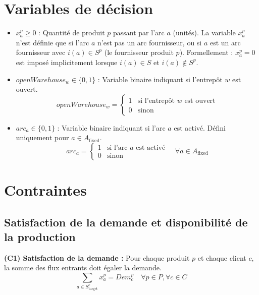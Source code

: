 \documentclass{article}
\begin{document}
\section{Variables de décision}

\begin{itemize}
    \item $x_a^p \ge 0$ : Quantité de produit $p$ passant par l'arc $a$ (unités).
    La variable $x_a^p$ n'est définie que si l'arc $a$ n'est pas un arc fournisseur,
    ou si $a$ est un arc fournisseur avec $i(a) \in S^p$ (le fournisseur produit $p$).
    Formellement : $x_a^p = 0$ est imposé implicitement lorsque $i(a) \in S$ et $i(a) \notin S^p$.

    \item $openWarehouse_w \in \{0, 1\}$ : Variable binaire indiquant si l'entrepôt $w$ est ouvert.
    \begin{equation*}
        openWarehouse_w = \begin{cases}
            1 & \text{si l'entrepôt } w \text{ est ouvert} \\
            0 & \text{sinon}
        \end{cases}
    \end{equation*}

    \item $arc_a \in \{0, 1\}$ : Variable binaire indiquant si l'arc $a$ est activé.
    \quad Défini uniquement pour $a \in A_{\text{fixed}}$.
    \begin{equation*}
        arc_a = \begin{cases}
            1 & \text{si l'arc } a \text{ est activé} \\
            0 & \text{sinon}
        \end{cases} \quad \forall a \in A_{\text{fixed}}
    \end{equation*}

\end{itemize}

\section{Contraintes}

\subsection{Satisfaction de la demande et disponibilité de la production}

\noindent\textbf{(C1) Satisfaction de la demande :}
Pour chaque produit $p$ et chaque client $c$, la somme des flux entrants doit égaler la demande.
\begin{equation}
    \sum_{a \in S_{\text{target}}^c} x_a^p = Dem_c^p \quad \forall p \in P, \forall c \in C \label{eq:demand}
\end{equation}
\end{document}
